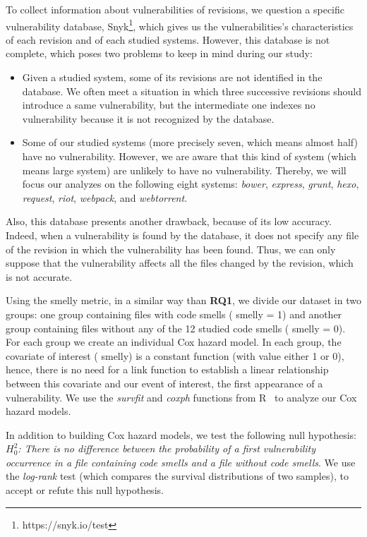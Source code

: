 {To collect information about vulnerabilities of revisions, we question a specific vulnerability database, Snyk\footnote{https://snyk.io/test}, which gives us the vulnerabilities's characteristics of each revision and of each studied systems. However, this database is not complete, which poses two problems to keep in mind during our study:
\begin{itemize}
	\item Given a studied system, some of its revisions are not identified in the database. We often meet a situation in which three successive revisions should introduce a same vulnerability, but the intermediate one indexes no vulnerability because it is not recognized by the database.
	\item Some of our studied systems (more precisely seven, which means almost half) have no vulnerability. However, we are aware that this kind of system (which means large system) are unlikely to have no vulnerability. Thereby, we will focus our analyzes on the following eight systems: \textsl{bower}, \textsl{express}, \textsl{grunt}, \textsl{hexo}, \textsl{request}, \textsl{riot}, \textsl{webpack}, and \textsl{webtorrent}.
\end{itemize}
Also, this database presents another drawback, because of its low accuracy. Indeed, when a vulnerability is found by the database, it does not specify any file of the revision in which the vulnerability has been found. Thus, we can only suppose that the vulnerability affects all the files changed by the revision, which is not accurate.

Using the smelly metric, in a similar way than \textbf{RQ1}, we divide our dataset in two groups: one group containing files with code smells (\ie{} smelly = 1) and another group containing files without any of the 12 studied code smells (\ie{} smelly = 0). For each group we create an individual Cox hazard model. In each group, the covariate of interest (\ie{} smelly) is a constant function (with value either 1 or 0), hence, there is no need for a link function to establish a linear relationship between this covariate and our event of interest, \ie{} the first appearance of a vulnerability. We use the \textsl{survfit} and \textsl{coxph} functions from R~\cite{rPackage} to analyze our Cox hazard models.

In addition to building Cox hazard models, we test the following null hypothesis: \emph{$H^{2}_{0}$: There is no difference between the probability of a first vulnerability occurrence in a file containing code smells and a file without code smells}. We use the \textsl{log-rank} test (which compares the survival distributions of two samples), to accept or refute this null hypothesis.

}
